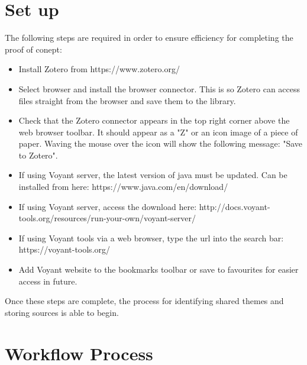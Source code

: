 \documentclass{article}
\begin{document}
\section{Set up}
The following steps are required in order to ensure efficiency for completing the proof of conept:
\begin{itemize}
    \item Install Zotero from https://www.zotero.org/
    \item Select browser and install the browser connector. This is so Zotero can access files straight from the browser and save them to the library.
    \item Check that the Zotero connector appears in the top right corner above the web browser toolbar. It should appear as a "Z" or an icon image of a piece of paper. Waving the mouse over the icon will show the following message: "Save to Zotero". 
    \item If using Voyant server, the latest version of java must be updated. Can be installed from here: https://www.java.com/en/download/
    \item If using Voyant server, access the download here: http://docs.voyant-tools.org/resources/run-your-own/voyant-server/
    \item If using Voyant tools via a web browser, type the url into the search bar: https://voyant-tools.org/
    \item Add Voyant website to the bookmarks toolbar or save to favourites for easier access in future.
\end{itemize}
Once these steps are complete, the process for identifying shared themes and storing sources is able to begin. 

\section{Workflow Process}
\end{document}
